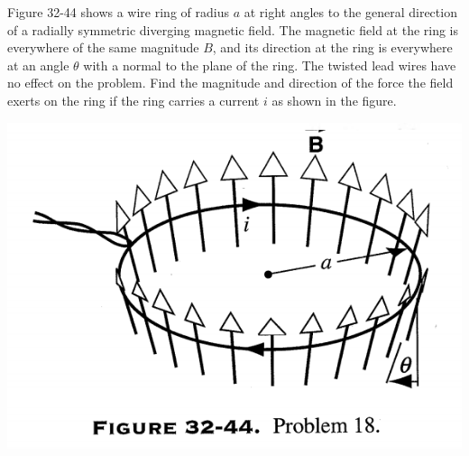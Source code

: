 \documentclass[12pt,letterpaper,boxed,cm]{hmcpset}
\begin{document}
\begin{problem}[32-P18]
	Figure 32-44 shows a wire ring of radius $a$ at right angles to the general direction of a radially symmetric diverging magnetic field. The magnetic field at the ring is everywhere of the same magnitude $B$, and its direction  at the ring is everywhere at an angle $\theta$ with a normal to the plane of the ring. The twisted lead wires have no effect on the problem. Find the magnitude and direction of the force the field exerts on the ring if the ring carries a current $i$ as shown in the figure.
	\begin{center}
		\includegraphics[scale=0.7]{02.png}	
	\end{center}
\end{problem}
\begin{solution}
\end{solution}
\newpage
\end{document}
